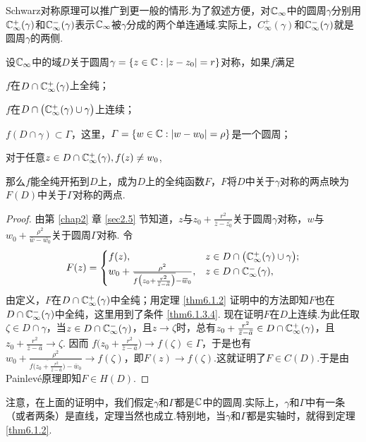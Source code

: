 Schwarz对称原理可以推广到更一般的情形.为了叙述方便，对$\mathbb C_\infty$中的圆周$\gamma$分别用$\mathbb C_\infty^+(\gamma)$和$\mathbb C_\infty^-(\gamma)$表示$\mathbb C_\infty$被$\gamma$分成的两个单连通域.实际上，$C_\infty^+(\gamma)$和$\mathbb C_\infty^-(\gamma)$就是圆周$\gamma$的两侧.
\begin{theorem}\label{thm6.1.3}
设$\mathbb C_\infty$中的域$D$关于圆周$\gamma=\{z\in\mathbb C:|z-z_0|=r\}$对称，如果$f$满足
\begin{eenum}
  \item \label{thm6.1.3.1}$f$在$D\cap\mathbb C_\infty^+(\gamma)$上全纯；
  \item \label{thm6.1.3.2}$f$在$D\cap\big(\mathbb C_\infty^+(\gamma)\cup\gamma\big)$上连续；
  \item \label{thm6.1.3.3}$f(D\cap\gamma)\subset\Gamma$，这里，$\varGamma=\{w\in\mathbb C:|w-w_0|=\rho\}$是一个圆周；
  \item \label{thm6.1.3.4}对于任意$z\in D\cap\mathbb C_\infty^+(\gamma),f(z)\ne w_0$,
\end{eenum}
那么$f$能全纯开拓到$D$上，成为$D$上的全纯函数$F$，$F$将$D$中关于$\gamma$对称的两点映为$F(D)$中关于$\Gamma$对称的两点.
\end{theorem}
\begin{proof}
  由第 \ref{chap2} 章 \ref{sec2.5} 节知道，$z$与$z_0+\frac{r^2}{\bar z-\bar {z_0}}$关于圆周$\gamma$对称，$w$与$w_0+\frac{\rho^2}{\bar w-\bar {w_0}}$关于圆周$\Gamma$对称. 令
  \[F(z)=\begin{cases}
  f(z),&z\in D\cap\big(\mathbb C_\infty^+(\gamma)\cup\gamma\big);\\
  w_0+\frac{\rho^2}{{}\mkern2mu\overline{\mkern-2muf\big(z_0+\frac{r^2}{{}\mkern2mu\overline{\mkern-2muz}-{}\mkern2mu\overline{\mkern-2mua}}\big)}-{}\mkern2mu\overline{\mkern-2muw}_0},&z\in D\cap
  \mathbb C_\infty^-(\gamma),
  \end{cases}\]
由定义，$F$在$D\cap\mathbb C_\infty^+(\gamma)$中全纯；用定理 \ref{thm6.1.2} 证明中的方法即知$F$也在$D\cap\mathbb C_\infty^-(\gamma)$中全纯，这里用到了条件 \ref{thm6.1.3.4}. 现在证明$F$在$D$上连续.为此任取$\zeta\in D\cap\gamma$，当$z\in D\cap\mathbb C_\infty^-(\gamma)$，且$z\to\zeta$时，总有$z_0+\frac{r^2}{{}\mkern2mu\overline{\mkern-2muz}-{}\mkern2mu\overline{\mkern-2mua}}\in D\cap\mathbb C_\infty^+(\gamma)$，且$z_0+\frac{r^2}{\bar z-\bar a}\to\zeta$. 因而 $f\bigg(z_0+\frac{r^2}{\bar z-\bar a}\bigg)\to f(\zeta)\in\Gamma$，于是也有$  w_0+\frac{\rho^2}{\bar{f\big(z_0+\frac{r^2}{\bar z-\bar a}\big)}-\bar w_0}\to f(\zeta)$，即$F(z)\to f(\zeta)$.这就证明了$F\in C(D)$.于是由Painlev\'e原理即知$F\in H(D)$.
\end{proof}

注意，在上面的证明中，我们假定$\gamma$和$\Gamma$都是$\mathbb C$中的圆周.实际上，$\gamma$和$\Gamma$中有一条（或者两条）是直线，定理当然也成立.特别地，当$\gamma$和$\Gamma$都是实轴时，就得到定理 \ref{thm6.1.2}.

